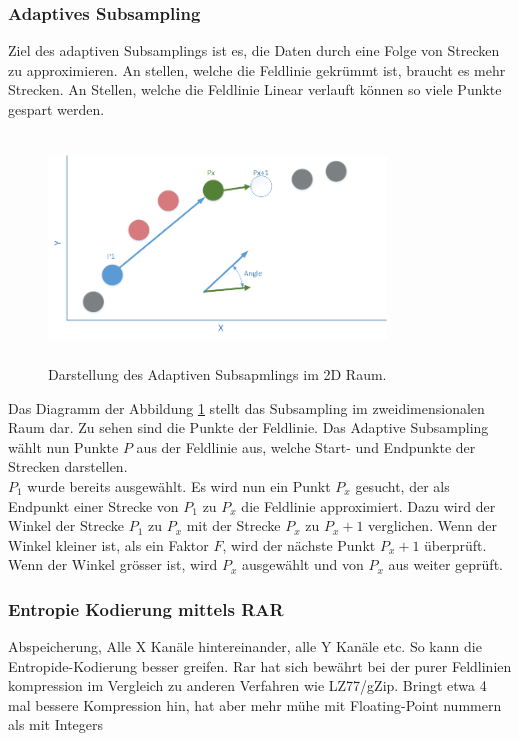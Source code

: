 \subsubsection{Adaptives Subsampling}\label{konzept:loesung0:subsampling}
Ziel des adaptiven Subsamplings ist es, die Daten durch eine Folge von Strecken zu approximieren. An stellen, welche die Feldlinie gekrümmt ist, braucht es mehr Strecken. An Stellen, welche die Feldlinie Linear verlauft können so viele Punkte gespart werden. 
\begin{figure}[!htbp]
	\center
	\includegraphics[width=0.8\textwidth,height=6cm,keepaspectratio]{./pictures/konzept/solution0/anglesubsampling.png}
	\caption{Darstellung des Adaptiven Subsapmlings im 2D Raum.}
	\label{konzept:loesung0:angle}
\end{figure}
Das Diagramm der Abbildung \ref{konzept:loesung0:angle} stellt das Subsampling im zweidimensionalen Raum dar. Zu sehen sind die Punkte der Feldlinie. Das Adaptive Subsampling wählt nun Punkte $P$ aus der Feldlinie aus, welche Start- und Endpunkte der Strecken darstellen.\\
$P_1$ wurde bereits ausgewählt. Es wird nun ein Punkt $P_x$ gesucht, der als Endpunkt einer Strecke von $P_1$ zu $P_x$ die Feldlinie approximiert. Dazu wird der Winkel der Strecke $P_1$ zu $P_x$ mit der Strecke $P_x$ zu $P_x+1$ verglichen. Wenn der Winkel kleiner ist, als ein Faktor $F$, wird der nächste Punkt $P_x+1$ überprüft. Wenn der Winkel grösser ist, wird $P_x$ ausgewählt und von $P_x$ aus weiter geprüft.

\subsubsection{Entropie Kodierung mittels RAR} \label{konzept:loesung0:kodierung}
Abspeicherung, Alle X Kanäle hintereinander, alle Y Kanäle etc. So kann die Entropide-Kodierung besser greifen.
Rar hat sich bewährt bei der purer Feldlinien kompression im Vergleich zu anderen Verfahren wie LZ77/gZip. Bringt etwa 4 mal bessere Kompression hin, hat aber mehr mühe mit Floating-Point nummern als mit Integers


